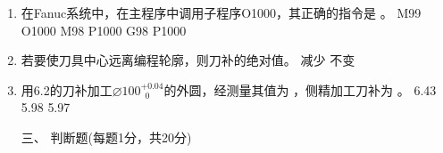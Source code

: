 \documentclass[12pt,twocolumn,landscape,UTF8,twoside]{ctexart}
\begin{document}
\begin{spacing}{1.3}
\begin{enumerate} [1、]
A{G81}{G82}{G85}
\item 在Fanuc系统中，在主程序中调用子程序O1000，其正确的指令是		。
		{M99 O1000}		{M98 P1000}		{G98 P1000}
\item 若要使刀具中心远离编程轮廓，则刀补的绝对值。
	{减少}	{不变}	
\item 用6.2的刀补加工$\diameter 100^{+0.04}_{~\; 0}$的外圆，经测量其值为 ，侧精加工刀补为	。
	{6.43}	{5.98}	{5.97}

\vspace{0cm}			
\item[\heiti 三、] { \heiti 判断题(每题1分，共20分)}
		

\end{enumerate}
\end{spacing}
\end{document}
